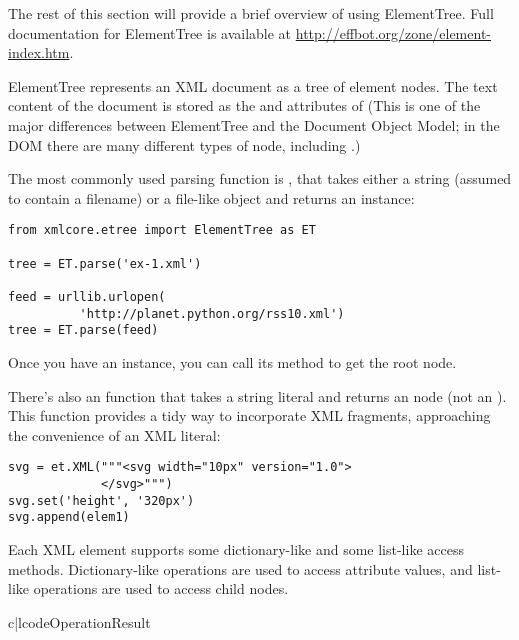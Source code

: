 \documentclass{howto}
\begin{document}
The rest of this section will provide a brief overview of using
ElementTree.  Full documentation for ElementTree is available at
\url{http://effbot.org/zone/element-index.htm}.

ElementTree represents an XML document as a tree of element nodes.
The text content of the document is stored as the 
and  attributes of 
(This is one of the major differences between ElementTree and 
the Document Object Model; in the DOM there are many different
types of node, including .)

The most commonly used parsing function is , that
takes either a string (assumed to contain a filename) or a file-like
object and returns an  instance:

\begin{verbatim}
from xmlcore.etree import ElementTree as ET

tree = ET.parse('ex-1.xml')

feed = urllib.urlopen(
          'http://planet.python.org/rss10.xml')
tree = ET.parse(feed)
\end{verbatim}

Once you have an  instance, you
can call its  method to get the root  node.

There's also an  function that takes a string literal
and returns an  node (not an ).  
This function provides a tidy way to incorporate XML fragments,
approaching the convenience of an XML literal:

\begin{verbatim}
svg = et.XML("""<svg width="10px" version="1.0">
             </svg>""")
svg.set('height', '320px')
svg.append(elem1)
\end{verbatim}

Each XML element supports some dictionary-like and some list-like
access methods.  Dictionary-like operations are used to access attribute
values, and list-like operations are used to access child nodes.

\begin{tableii}{c|l}{code}{Operation}{Result}
\end{tableii}
\end{document}
